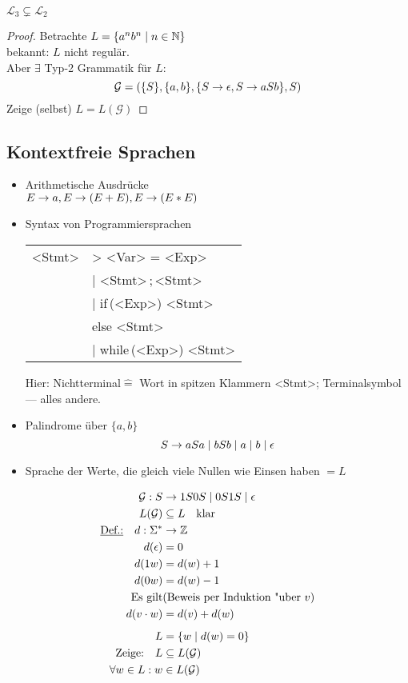\begin{lemma}
	$\mathcal{L}_3 \subsetneq \mathcal{L}_2$
\end{lemma}
\begin{proof}
	Betrachte $L=\{a^nb^n \mid n\in\mathbb{N} \}$\\
	bekannt: $L$ nicht regulär.\\
	Aber $\exists$ Typ-2 Grammatik für $L$:
	\[ \mathcal{G} = (\{S\}, \{a,b\}, \{S\->\epsilon, S\->aSb \}, S) \]
	Zeige (selbst) $L=L(\mathcal{G})$
\end{proof}

\subsection{Kontextfreie Sprachen}
\begin{itemize}
\item Arithmetische Ausdrücke\\
	$E\->a,E\->(E+E),E\->(E*E)$
\item Syntax von Programmiersprachen%
	\begin{center}
		\begin{tabular}[t]{r@{ }l}
			<Stmt> &\-> <Var> = <Exp>\\
			&| <Stmt>\,;\,<Stmt>\\
			&| if\,(<Exp>) <Stmt>\\
			&\phantom{|} else <Stmt>\\
			&| while\,(<Exp>) <Stmt>
		\end{tabular}
	\end{center}%
	Hier: Nichtterminal$\hat=$ Wort in spitzen Klammern <Stmt>;
	Terminalsymbol --- alles andere.
\item Palindrome über $\{a,b\}$
	\[ S\-> aSa \mid bSb \mid a \mid b \mid \epsilon \]
\item Sprache der Werte, die gleich viele Nullen wie Einsen haben $=L$
\end{itemize}
\begin{align*}
	\mathcal{G}: S &\-> 1S0S \mid 0S1S \mid \epsilon\\
	L(\mathcal{G}) &\subseteq L \quad \text{klar}\\
	\uline{\text{Def.:}}\quad d:\Sigma^* &\-> \Z\\
	d(\epsilon) &= 0\\
	d(1w) &= d(w) + 1\\
	d(0w) &= d(w) - 1\\
	\text{Es gilt} & \text{(Beweis per Induktion "uber $v$)} \\
	d(v\cdot w) &= d(v)+d(w)\\[.5em]
	L &= \{ w \mid d(w)=0 \}\\
	\text{Zeige:}\quad L &\subseteq L(\mathcal{G})\\
	\forall w\in L : w&\in L(\mathcal{G})
\end{align*}

